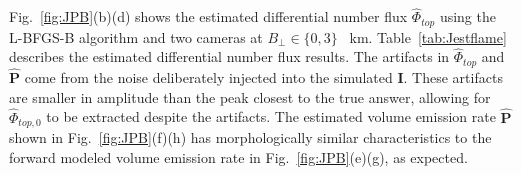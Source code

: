 Fig.~\ref{fig:JPB}(b)(d) shows the estimated differential number flux $\hat{\Phi}_{top}$ using the L-BFGS-B algorithm and two cameras at $B_\perp \in\{0,3\}$ ~km.
Table~\ref{tab:Jestflame} describes the estimated differential number flux results.
The artifacts in $\hat{\Phi}_{top}$ and $\mathbf{\widehat{P}}$ come from the noise deliberately injected into the simulated $\mathbf{I}$. 
These artifacts are smaller in amplitude than the peak closest to the true answer, allowing for $\hat{\Phi}_{top,0}$ to be extracted despite the artifacts.
The estimated volume emission rate $\hat{\mathbf{P}}$ shown in Fig.~\ref{fig:JPB}(f)(h) has morphologically similar characteristics to the forward modeled volume emission rate in Fig.~\ref{fig:JPB}(e)(g), as expected. 

